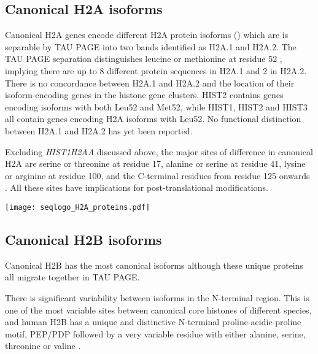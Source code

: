   \subsection{Canonical H2A isoforms}
    Canonical H2A genes encode \HTwoAUniqueProteins{} different H2A protein isoforms ()
    which are is separable by TAU PAGE into two bands identified as H2A.1 and H2A.2.
    The TAU PAGE separation distinguishes leucine or methionine at residue 52 \citep{FranklinZweidler1977,Zweidler1977},
    implying there are up to 8 different protein sequences in H2A.1 and 2 in H2A.2.
    There is no concordance between H2A.1 and H2A.2
    and the location of their isoform-encoding genes in the histone gene clusters.
    HIST2 contains genes encoding isoforms with both Leu52 and Met52,
    while HIST1, HIST2 and HIST3 all contain genes encoding H2A isoforms with Leu52.
    No functional distinction between H2A.1 and H2A.2 has yet been reported.

    Excluding \textit{HIST1H2AA} discussed above,
    the major sites of difference in canonical H2A are
    serine or threonine at residue 17,
    alanine or serine at residue 41,
    lysine or arginine at residue 100,
    and the C-terminal residues from residue 125 onwards .
    All these sites have implications for post-translational modifications.

    \begin{TableAndFigure*}
      \label{tab:H2A-consensus}
      
      \label{fig:H2A-weblogo}
      \texttt{[image: seqlogo\_H2A\_proteins.pdf]}
    \end{TableAndFigure*}

  \subsection{Canonical H2B isoforms}
    Canonical H2B has the most canonical isoforms 
    although these \HTwoBUniqueProteins{} unique proteins all migrate together in TAU PAGE.

    There is significant variability between isoforms in the N-terminal region.
    This is one of the most variable sites between canonical core histones of different species, and
    human H2B has a unique and distinctive N-terminal proline-acidic-proline motif, PEP/PDP
    followed by a very variable residue with either alanine, serine, threonine or valine .

